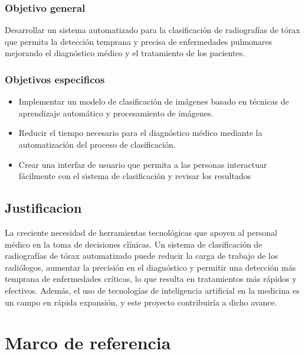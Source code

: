 \documentclass[conference]{IEEEtran}
\begin{document}
\subsubsection{Objetivo general}
Desarrollar un sistema automatizado para la clasificación de radiografías de tórax que permita la detección temprana y precisa de enfermedades pulmonares mejorando el diagnóstico médico y el tratamiento de los pacientes.
\subsubsection{Objetivos especificos}
\begin{itemize}
    \item Implementar un modelo de clasificación de imágenes basado en técnicas de aprendizaje automático y procesamiento de imágenes.
    \item Reducir el tiempo necesario para el diagnóstico médico mediante la automatización del proceso de clasificación.
    \item Crear una interfaz de usuario que permita a las personas interactuar fácilmente con el sistema de clasificación y revisar los resultados
\end{itemize}
\subsection{Justificacion}
La creciente necesidad de herramientas tecnológicas que apoyen al personal médico en la toma de decisiones clínicas. Un sistema de clasificación de radiografías de tórax automatizado puede reducir la carga de trabajo de los radiólogos, aumentar la precisión en el diagnóstico y permitir una detección más temprana de enfermedades críticas, lo que resulta en tratamientos más rápidos y efectivos. Además, el uso de tecnologías de inteligencia artificial en la medicina es un campo en rápida expansión, y este proyecto contribuiría a dicho avance.
\section{Marco de referencia}
\end{document}
